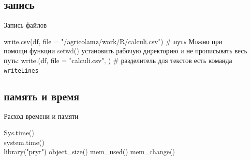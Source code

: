 \subsection{запись}
\begin{frame}[fragile]{Запись файлов}
\begin{itemize}
\mytem write.csv(df, file = "/agricolamz/work/R/calculi.csv") \hfill \# путь \vfill
Можно при помощи функции setwd() установить рабочую директорию и не прописывать весь путь:
\mytem write.{\color{red!13!blue}{table}}(df, file = "calculi.csv"{}, {}) \hfill \# разделитель \vfill
\mytem для текстов есть команда \footnotesize\verb"writeLines"\normalsize
\end{itemize}
\end{frame}
\subsection{память и время}
\begin{frame}[fragile]{Расход времени и памяти}
\begin{itemize}
\mytem Sys.time()\\
\mytem system.time()\bigskip\\
library("pryr")
\mytem object{\_}size()
\mytem mem{\_}used()
\mytem mem{\_}change()
\end{itemize}
\end{frame}
